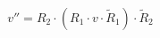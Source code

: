 \documentclass[preview]{standalone}
\begin{document}
\begin{align*}
v'' = R_2 \cdot (R_1 \cdot v \cdot \tilde{R}_1) \cdot \tilde{R}_2
\end{align*}
\end{document}
